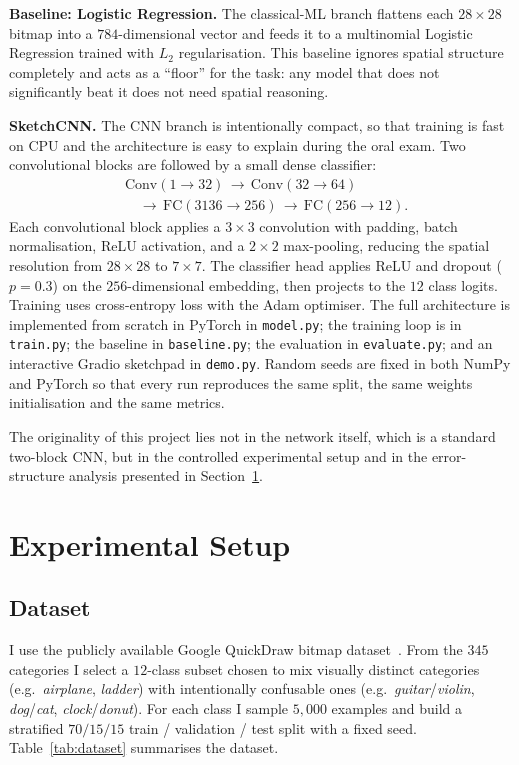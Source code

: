 \documentclass[10pt,twocolumn,a4paper]{article}
\begin{document}
\textbf{Baseline: Logistic Regression.}
The classical-ML branch flattens each $28\times28$ bitmap into a
$784$-dimensional vector and feeds it to a multinomial Logistic Regression
trained with $L_2$ regularisation. This baseline ignores spatial structure
completely and acts as a ``floor'' for the task: any model that does not
significantly beat it does not need spatial reasoning.

\textbf{SketchCNN.}
The CNN branch is intentionally compact, so that training is fast on CPU and
the architecture is easy to explain during the oral exam. Two convolutional
blocks are followed by a small dense classifier:
\[
\begin{aligned}
	&\text{Conv}(1\!\to\!32) \,\to\, \text{Conv}(32\!\to\!64) \\
	&\quad\to\, \text{FC}(3136\!\to\!256) \,\to\, \text{FC}(256\!\to\!12).
\end{aligned}
\]
Each convolutional block applies a $3\times3$ convolution with padding,
batch normalisation, ReLU activation, and a $2\times2$ max-pooling, reducing
the spatial resolution from $28\times28$ to $7\times7$. The classifier head
applies ReLU and dropout ($p=0.3$) on the $256$-dimensional embedding, then
projects to the $12$ class logits. Training uses cross-entropy loss with the
Adam optimiser. The full architecture is implemented from scratch in PyTorch
in \texttt{model.py}; the training loop is in \texttt{train.py}; the baseline
in \texttt{baseline.py}; the evaluation in \texttt{evaluate.py}; and an
interactive Gradio sketchpad in \texttt{demo.py}. Random seeds are fixed in
both NumPy and PyTorch so that every run reproduces the same split, the same
weights initialisation and the same metrics.

The originality of this project lies not in the network itself, which is a
standard two-block CNN, but in the controlled experimental setup and in the
error-structure analysis presented in Section~\ref{sec:exp}.

\section{Experimental Setup}
\label{sec:exp}

\subsection{Dataset}

I use the publicly available Google QuickDraw bitmap dataset~\cite{quickdraw}.
From the $345$ categories I select a $12$-class subset chosen to mix visually
distinct categories (e.g.\ \emph{airplane}, \emph{ladder}) with intentionally
confusable ones (e.g.\ \emph{guitar}/\emph{violin}, \emph{dog}/\emph{cat},
\emph{clock}/\emph{donut}). For each class I sample $5{,}000$ examples and
build a stratified $70/15/15$ train / validation / test split with a fixed
seed. Table~\ref{tab:dataset} summarises the dataset.
\end{document}
